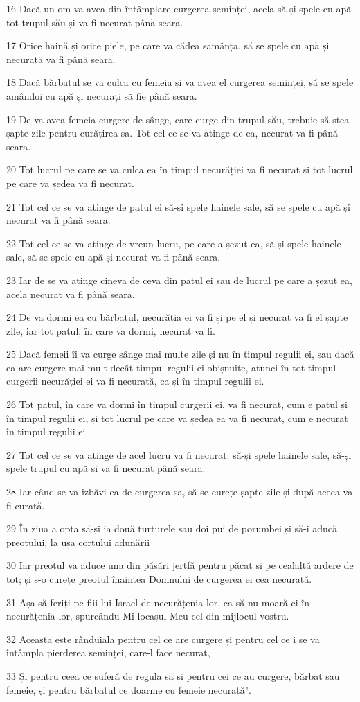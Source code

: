 \par 16 Dacă un om va avea din întâmplare curgerea seminței, acela să-și spele cu apă tot trupul său și va fi necurat până seara.
\par 17 Orice haină și orice piele, pe care va cădea sămânța, să se spele cu apă și necurată va fi până seara.
\par 18 Dacă bărbatul se va culca cu femeia și va avea el curgerea seminței, să se spele amândoi cu apă și necurați să fie până seara.
\par 19 De va avea femeia curgere de sânge, care curge din trupul său, trebuie să stea șapte zile pentru curățirea sa. Tot cel ce se va atinge de ea, necurat va fi până seara.
\par 20 Tot lucrul pe care se va culca ea în timpul necurăției va fi necurat și tot lucrul pe care va ședea va fi necurat.
\par 21 Tot cel ce se va atinge de patul ei să-și spele hainele sale, să se spele cu apă și necurat va fi până seara.
\par 22 Tot cel ce se va atinge de vreun lucru, pe care a șezut ea, să-și spele hainele sale, să se spele cu apă și necurat va fi până seara.
\par 23 Iar de se va atinge cineva de ceva din patul ei sau de lucrul pe care a șezut ea, acela necurat va fi până seara.
\par 24 De va dormi ea cu bărbatul, necurăția ei va fi și pe el și necurat va fi el șapte zile, iar tot patul, în care va dormi, necurat va fi.
\par 25 Dacă femeii îi va curge sânge mai multe zile și nu în timpul regulii ei, sau dacă ea are curgere mai mult decât timpul regulii ei obișnuite, atunci în tot timpul curgerii necurăției ei va fi necurată, ca și în timpul regulii ei.
\par 26 Tot patul, în care va dormi în timpul curgerii ei, va fi necurat, cum e patul și în timpul regulii ei, și tot lucrul pe care va ședea ea va fi necurat, cum e necurat în timpul regulii ei.
\par 27 Tot cel ce se va atinge de acel lucru va fi necurat: să-și spele hainele sale, să-și spele trupul cu apă și va fi necurat până seara.
\par 28 Iar când se va izbăvi ea de curgerea sa, să se curețe șapte zile și după aceea va fi curată.
\par 29 În ziua a opta să-și ia două turturele sau doi pui de porumbei și să-i aducă preotului, la ușa cortului adunării
\par 30 Iar preotul va aduce una din păsări jertfă pentru păcat și pe cealaltă ardere de tot; și s-o curețe preotul înaintea Domnului de curgerea ei cea necurată.
\par 31 Așa să feriți pe fiii lui Israel de necurățenia lor, ca să nu moară ei în necurățenia lor, spurcându-Mi locașul Meu cel din mijlocul vostru.
\par 32 Aceasta este rânduiala pentru cel ce are curgere și pentru cel ce i se va întâmpla pierderea seminței, care-l face necurat,
\par 33 Și pentru ceea ce suferă de regula sa și pentru cei ce au curgere, bărbat sau femeie, și pentru bărbatul ce doarme cu femeie necurată".

